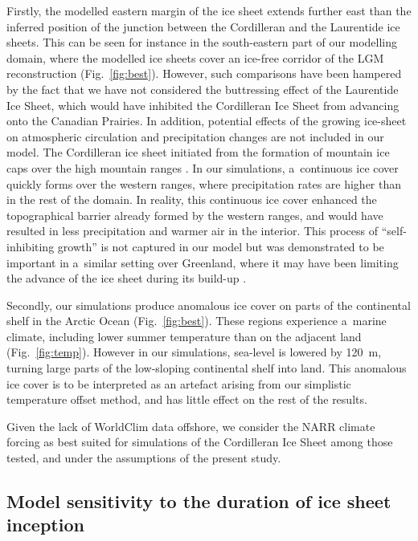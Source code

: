 \documentclass[tc, ms]{copernicus}
\begin{document}
Firstly, the modelled eastern margin of the ice sheet extends further east than the inferred position of the junction between the Cordilleran and the Laurentide ice sheets. This can be seen for instance in the south-eastern part of our modelling domain, where the modelled ice sheets cover an ice-free corridor of the LGM reconstruction (Fig.~\ref{fig:best}). However, such comparisons have been hampered by the fact that we have not considered the buttressing effect of the Laurentide Ice Sheet, which would have inhibited the Cordilleran Ice Sheet from advancing onto the Canadian Prairies. In addition, potential effects of the growing ice-sheet on atmospheric circulation and precipitation changes are not included in our model. The Cordilleran ice sheet initiated from the formation of mountain ice caps over the high mountain ranges \citep{clague-1989}. In our simulations, a~continuous ice cover quickly forms over the western ranges, where precipitation rates are higher than in the rest of the domain. In reality, this continuous ice cover enhanced the topographical barrier already formed by the western ranges, and would have resulted in less precipitation and warmer air in the interior. This process of ``self-inhibiting growth'' is not captured in our model but was demonstrated to be important in a~similar setting over Greenland, where it may have been limiting the advance of the ice sheet during its build-up \citep{langen-etal-2012}.

Secondly, our simulations produce anomalous ice cover on parts of the continental shelf in the Arctic Ocean (Fig.~\ref{fig:best}). These regions experience a~marine climate, including lower summer temperature than on the adjacent land (Fig.~\ref{fig:temp}). However in our simulations, sea-level is lowered by 120~m, turning large parts of the low-sloping continental shelf into land. This anomalous ice cover is to be interpreted as an artefact arising from our simplistic temperature offset method, and has little effect on the rest of the results.

Given the lack of WorldClim data offshore, we consider the NARR climate forcing as best suited for simulations of the Cordilleran Ice Sheet among those tested, and under the assumptions of the present study.

\subsection{Model sensitivity to the duration of ice sheet inception}
\end{document}
